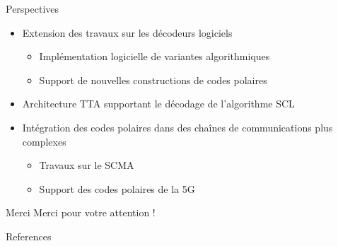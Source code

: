 \begin{frame}[c]{Perspectives}

  \begin{itemize}
    \renewcommand*{\bibfont}{\scriptsize}
    \vfill
    \item<+-> Extension des travaux sur les décodeurs logiciels
    \begin{itemize}
      \item Implémentation logicielle de variantes algorithmiques
      \item Support de nouvelles constructions de codes polaires
    \end{itemize}
    \vfill
    \item<+-> Architecture TTA supportant le décodage de l'algorithme SCL
    \vfill
    \item<+-> Intégration des codes polaires dans des chaînes de communications plus complexes
    \begin{itemize}
      \item Travaux sur le SCMA
      \item Support des codes polaires de la 5G
    \end{itemize}
    \vfill
  \end{itemize}

\end{frame}

\begin{frame}[c]{Merci}
\vfill
\centering
Merci pour votre attention !
\vfill
\end{frame}

\begin{frame}[allowframebreaks]{References}
\renewcommand*{\bibfont}{\scriptsize}

\printbibliography
\end{frame}
